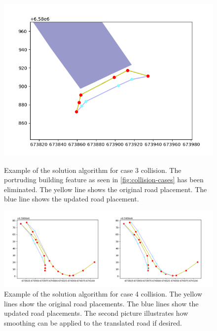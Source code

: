 \documentclass{kththesis}
\begin{document}
\begin{figure}[H]
    \centering
    \includegraphics[width=\textwidth,height=0.5\textheight,keepaspectratio]{img_feature_overlap_fix_2}
    \label{fig:collision-case-3}
    \caption{Example of the solution algorithm for case 3 collision. The portruding building feature as seen in \ref{fig:collision-cases} has been eliminated. The yellow line shows the original road placement. The blue line shows the updated road placement.}
\end{figure}

\begin{figure}[H]
    \centering
    \includegraphics[width=\textwidth,height=0.5\textheight,keepaspectratio]{img_feature_overlap_fix_3}
    \caption{Example of the solution algorithm for case 4 collision. The yellow lines show the original road placements. The blue lines show the updated road placements. The second picture illustrates how smoothing can be applied to the translated road if desired.}
    \label{fig:collision-case-4}
\end{figure}
\end{document}
